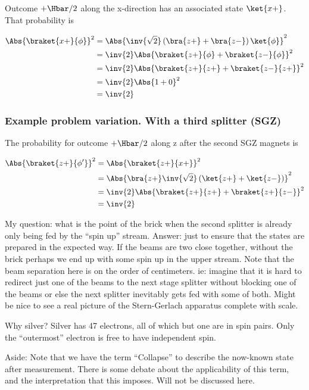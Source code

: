 Outcome $+\Hbar/2$ along the x-direction has an associated state $\ket{x+}$.  That probability is

\begin{align*}
\Abs{\braket{x+}{\phi}}^2
&=
\Abs{
\inv{\sqrt{2}} \left( \bra{z+} + \bra{z-} \right) \ket{\phi}
}^2 \\
&=
\inv{2}
\Abs{
\braket{z+}{\phi} + \braket{z-}{\phi}
}^2 \\
&=
\inv{2}
\Abs{
\braket{z+}{z+} + \braket{z-}{z+}
}^2 \\
&=
\inv{2}
\Abs{
1 + 0
}^2 \\
&=
\inv{2}
\end{align*}

\subsubsection{Example problem variation.  With a third splitter (SGZ)}

The probability for outcome $+\Hbar/2$ along z after the second SGZ magnets is

\begin{align*}
\Abs{\braket{z+}{\phi'}}^2
&=
\Abs{\braket{z+}{x+}}^2 \\
&=
\Abs{\bra{z+} \inv{\sqrt{2}} \left( \ket{z+} + \ket{z-} \right) }^2 \\
&=
\inv{2}
\Abs{\braket{z+}{z+} + \braket{z+}{z-} }^2 \\
&=
\inv{2}
\end{align*}

My question: what is the point of the brick when the second splitter is already only being fed by the ``spin up'' stream.  Answer: just to ensure that the states are prepared in the expected way.  If the beams are two close together, without the brick perhaps we end up with some spin up in the upper stream.  Note that the beam separation here is on the order of centimeters.  ie: imagine that it is hard to redirect just one of the beams to the next stage splitter without blocking one of the beams or else the next splitter inevitably gets fed with some of both.  Might be nice to see a real picture of the Stern-Gerlach apparatus complete with scale.

Why silver?  Silver has 47 electrons, all of which but one are in spin pairs.  Only the ``outermost'' electron is free to have independent spin.

Aside: Note that we have the term ``Collapse'' to describe the now-known state after measurement.  There is some debate about the applicability of this term, and the interpretation that this imposes.  Will not be discussed here.

